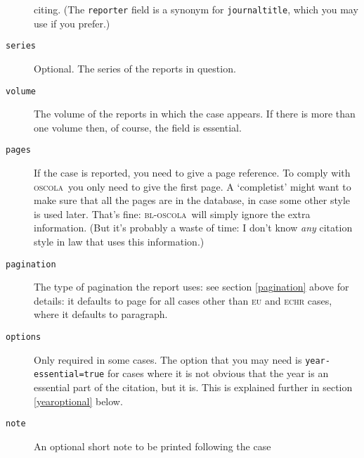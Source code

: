 \documentclass[a5paper,fontsize=9pt,DIV=1]{scrartcl}
\newcommand{\oscola}{\textsc{bl-oscola}}
\newcommand{\oscolashort}{\textsc{oscola}\nocite{oscola}}
\begin{document}
\begin{description}
  citing. (The \texttt{reporter}  field is a synonym for
  \texttt{journaltitle}, which you may use if you prefer.)
\item[\texttt{series}]
Optional. The series of the reports in
  question.
\item[\texttt{volume}]
The volume of the reports in which the case
  appears. If there is more than one volume then, of course, the field
  is essential.
\item[\texttt{pages}]
If the case is reported, you need to give a page
  reference. To comply with \oscolashort\ you only need to give
  the first page. A `completist' might want to make sure that all the
  pages are in the database, in case some other style is used
  later. That's fine: \oscola\ will simply ignore the extra
  information. (But it's probably a waste of time: I don't know
  \emph{any} citation style in law that uses this information.)
\item[\texttt{pagination}]
The type of pagination the report uses: see
  section \ref{pagination} above for details: it defaults to page for
  all cases other than \textsc{eu} and \textsc{echr} cases, where it
  defaults to paragraph.
\item[\texttt{options}] 
Only required in some cases. The option
  that you may need is \texttt{year-essential=true}
  for cases where it is not obvious that the year is an essential
  part of the citation, but it is. This is explained further in
  section \ref{yearoptional} below.
\item[\texttt{note}]
An optional short note to be printed following the case

\end{description}
\end{document}
